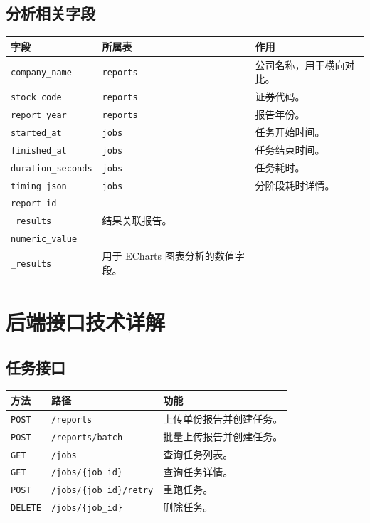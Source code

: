 \documentclass[UTF8,a4paper,12pt]{ctexart}
\newenvironment{manualtable}[1]{%
  \small
  \begin{longtable}{#1}
}{%
  \end{longtable}
  \normalsize
}
\begin{document}
\subsection{分析相关字段}

\begin{manualtable}{p{4cm}p{3.5cm}p{7cm}}
\toprule
\textbf{字段} & \textbf{所属表} & \textbf{作用} \\
\midrule
\endhead
\texttt{company\_name} & \texttt{reports} & 公司名称，用于横向对比。 \\
\texttt{stock\_code} & \texttt{reports} & 证券代码。 \\
\texttt{report\_year} & \texttt{reports} & 报告年份。 \\
\texttt{started\_at} & \texttt{jobs} & 任务开始时间。 \\
\texttt{finished\_at} & \texttt{jobs} & 任务结束时间。 \\
\texttt{duration\_seconds} & \texttt{jobs} & 任务耗时。 \\
\texttt{timing\_json} & \texttt{jobs} & 分阶段耗时详情。 \\
\texttt{report\_id} & \makecell[l]{\texttt{extraction}\\\texttt{\_results}} & 结果关联报告。 \\
\texttt{numeric\_value} & \makecell[l]{\texttt{extraction}\\\texttt{\_results}} & 用于 ECharts 图表分析的数值字段。 \\
\bottomrule
\end{manualtable}

\section{后端接口技术详解}

\subsection{任务接口}

\begin{manualtable}{p{2.5cm}p{6cm}p{6cm}}
\toprule
\textbf{方法} & \textbf{路径} & \textbf{功能} \\
\midrule
\endhead
\texttt{POST} & \texttt{/reports} & 上传单份报告并创建任务。 \\
\texttt{POST} & \texttt{/reports/batch} & 批量上传报告并创建任务。 \\
\texttt{GET} & \texttt{/jobs} & 查询任务列表。 \\
\texttt{GET} & \texttt{/jobs/\{job\_id\}} & 查询任务详情。 \\
\texttt{POST} & \texttt{/jobs/\{job\_id\}/retry} & 重跑任务。 \\
\texttt{DELETE} & \texttt{/jobs/\{job\_id\}} & 删除任务。 \\
\bottomrule
\end{manualtable}
\end{document}
